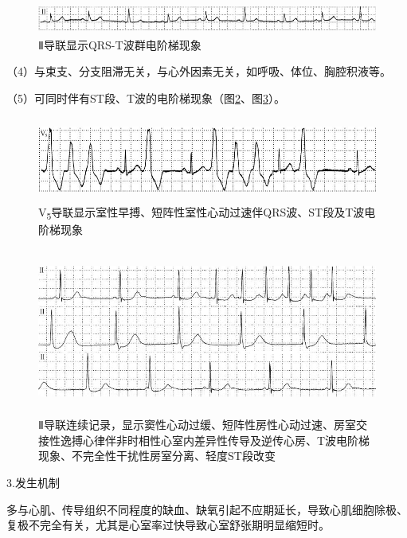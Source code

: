 \begin{figure}[!htbp]
 \centering
 \includegraphics[width=5.625in,height=0.39583in]{./images/Image00656.jpg}
 \captionsetup{justification=centering}
 \caption{Ⅱ导联显示QRS-T波群电阶梯现象}
 \label{fig39-7}
  \end{figure} 

（4）与束支、分支阻滞无关，与心外因素无关，如呼吸、体位、胸腔积液等。

（5）可同时伴有ST段、T波的电阶梯现象（图\ref{fig39-8}、图\ref{fig39-9}）。

\begin{figure}[!htbp]
 \centering
 \includegraphics[width=5.65625in,height=1.09375in]{./images/Image00657.jpg}
 \captionsetup{justification=centering}
 \caption{V\textsubscript{5}导联显示室性早搏、短阵性室性心动过速伴QRS波、ST段及T波电阶梯现象}
 \label{fig39-8}
  \end{figure} 


\begin{figure}[!htbp]
 \centering
 \includegraphics[width=5.58333in,height=2.15625in]{./images/Image00658.jpg}
 \captionsetup{justification=centering}
 \caption{Ⅱ导联连续记录，显示窦性心动过缓、短阵性房性心动过速、房室交接性逸搏心律伴非时相性心室内差异性传导及逆传心房、T波电阶梯现象、不完全性干扰性房室分离、轻度ST段改变}
 \label{fig39-9}
  \end{figure} 

3.发生机制

多与心肌、传导组织不同程度的缺血、缺氧引起不应期延长，导致心肌细胞除极、复极不完全有关，尤其是心室率过快导致心室舒张期明显缩短时。

